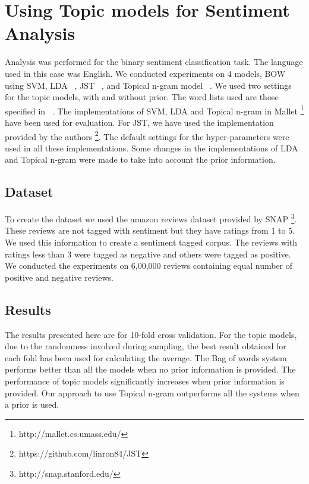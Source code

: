 \section{Using Topic models for Sentiment Analysis}

Analysis was performed for the binary sentiment classification task. The language used in this case was English.
We conducted experiments on 4 models, BOW using SVM, LDA ~\citep*{blei2003latent}, JST ~\citep*{lin2009joint}, and 
Topical n-gram model ~\citep*{wang2007topical}. We used two settings for the topic models, with and without prior. 
The word lists used are those specified in ~\citep*{liu2010sentiment}. The implementations of SVM, LDA and Topical
n-gram in Mallet \footnote{http://mallet.cs.umass.edu/} have been used for evaluation. For JST, we have used the 
implementation provided by the authors \footnote{https://github.com/linron84/JST}. The default settings for the
hyper-parameters were used in all these implementations. Some changes in the implementations of LDA and Topical
n-gram were made to take into account the prior information.

\subsection*{Dataset}

To create the dataset we used the amazon reviews dataset provided by SNAP \footnote{http://snap.stanford.edu/}.
These reviews are not tagged with sentiment but they have ratings from 1 to 5. We used this information to create
a sentiment tagged corpus. The reviews with ratings less than 3 were tagged as negative and others were tagged
as positive. We conducted the experiments on 6,00,000 reviews containing equal number of positive and negative
reviews.

\subsection*{Results}\label{results}

The results presented here are for 10-fold cross validation. For the topic models, due to the randomness involved 
during sampling, the best result obtained for each fold has been used for calculating the average. The Bag of words 
system performs better than all the models when no prior information is provided. The performance of topic models 
significantly increases when prior information is provided. Our approach to use Topical n-gram outperforms all the 
systems when a prior is used.

